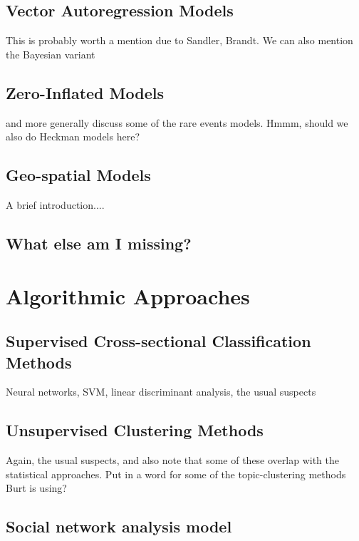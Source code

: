 \documentclass[graybox]{svmult}
\begin{document}
\subsection{Vector Autoregression Models}
\label{subsec:VAR}

This is probably worth a mention due to Sandler, Brandt. We can also mention the Bayesian variant

\subsection{Zero-Inflated Models}
\label{subsec:ZI}

and more generally discuss some of the rare events models. Hmmm, should we also do Heckman models here?

\subsection{Geo-spatial Models}
\label{subsec:ZI}

A brief introduction....

\subsection{What else am I missing?}
\label{subsec:missing}



\section{Algorithmic Approaches}
\label{sec:algor}

\subsection{Supervised Cross-sectional Classification Methods}
\label{sec:logit}

Neural networks, SVM, linear discriminant analysis, the usual suspects


\subsection{Unsupervised Clustering Methods}
\label{sec:logit}

Again, the usual suspects, and also note that some of these overlap with the statistical approaches. Put in a word for some of the topic-clustering methods Burt is using?

\subsection{Social network analysis model}
\label{sec:timeseries}
\end{document}
